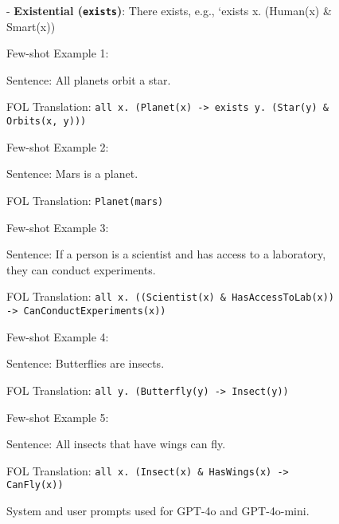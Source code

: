 \begin{figure*}[ht]
\begin{fullwidthbox}[title=System prompt]
   - \textbf{Existential (\texttt{exists})}: There exists, e.g., `exists x. (Human(x) \& Smart(x))
\end{fullwidthbox}

\begin{fullwidthbox}[title=User prompt (5-shot)]
\small
Few-shot Example 1:

Sentence: All planets orbit a star.

FOL Translation:
\texttt{all x. (Planet(x) -> exists y. (Star(y) \& Orbits(x, y)))}

Few-shot Example 2:

Sentence: Mars is a planet.

FOL Translation:
\texttt{Planet(mars)}

Few-shot Example 3:

Sentence: If a person is a scientist and has access to a laboratory, they can conduct experiments.

FOL Translation:
\texttt{all x. ((Scientist(x) \& HasAccessToLab(x)) -> CanConductExperiments(x))}

Few-shot Example 4:

Sentence: Butterflies are insects.

FOL Translation:
\texttt{all y. (Butterfly(y) -> Insect(y))}

Few-shot Example 5:

Sentence: All insects that have wings can fly.

FOL Translation:
\texttt{all x. (Insect(x) \& HasWings(x) -> CanFly(x))}
\end{fullwidthbox}
\caption{System and user prompts used for GPT-4o and GPT-4o-mini.}
\label{fig:prompts}

\end{figure*}